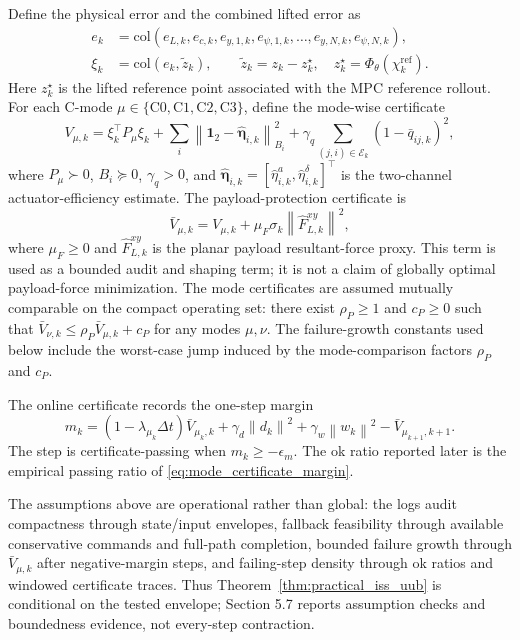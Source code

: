 \documentclass[twocolumn,3p,times,procedia]{elsarticle}
\newcommand{\norm}[1]{\left\lVert #1 \right\rVert}
\begin{document}
Define the physical error and the combined lifted error as
\begin{equation}
\begin{aligned}
e_k&=\mathrm{col}\left(e_{L,k},e_{c,k},e_{y,1,k},e_{\psi,1,k},\ldots,e_{y,N,k},e_{\psi,N,k}\right),\\
\xi_k&=\mathrm{col}\left(e_k,\tilde z_k\right),
\qquad
\tilde z_k=z_k-z_k^\star,\quad
z_k^\star=\Phi_\theta(\chi_k^{\mathrm{ref}}).
\end{aligned}
\label{eq:xi_def}
\end{equation}
Here $z_k^\star$ is the lifted reference point associated with the MPC reference rollout. For each C-mode $\mu\in\{\mathrm{C0},\mathrm{C1},\mathrm{C2},\mathrm{C3}\}$, define the mode-wise certificate
\begin{equation}
V_{\mu,k}=\xi_k^\top P_\mu\xi_k+
\sum_i\norm{\mathbf 1_2-\hat{\boldsymbol\eta}_{i,k}}_{B_i}^2+
\gamma_q\sum_{(j,i)\in\mathcal E_k}(1-\bar q_{ij,k})^2 ,
\label{eq:lyapunov}
\end{equation}
where $P_\mu\succ0$, $B_i\succeq0$, $\gamma_q>0$, and
$\hat{\boldsymbol\eta}_{i,k}=[\hat\eta^a_{i,k},\hat\eta^\delta_{i,k}]^\top$ is the two-channel actuator-efficiency estimate. The payload-protection certificate is
\begin{equation}
\bar V_{\mu,k}=V_{\mu,k}+\mu_F\sigma_k\norm{\hat F_{L,k}^{xy}}^2 ,
\label{eq:augmented_lyapunov}
\end{equation}
where $\mu_F\ge0$ and $\hat F_{L,k}^{xy}$ is the planar payload resultant-force proxy. This term is used as a bounded audit and shaping term; it is not a claim of globally optimal payload-force minimization. The mode certificates are assumed mutually comparable on the compact operating set: there exist $\rho_P\ge1$ and $c_P\ge0$ such that
$\bar V_{\nu,k}\le \rho_P\bar V_{\mu,k}+c_P$ for any modes $\mu,\nu$.
The failure-growth constants used below include the worst-case jump induced by the mode-comparison factors $\rho_P$ and $c_P$.

The online certificate records the one-step margin
\begin{equation}
m_k=(1-\lambda_{\mu_k}\Delta t)\bar V_{\mu_k,k}
+\gamma_d\norm{d_k}^2+\gamma_w\norm{w_k}^2
-\bar V_{\mu_{k+1},k+1}.
\label{eq:mode_certificate_margin}
\end{equation}
The step is certificate-passing when $m_k\ge-\epsilon_m$. The ok ratio reported later is the empirical passing ratio of \eqref{eq:mode_certificate_margin}.

The assumptions above are operational rather than global: the logs audit compactness through state/input envelopes, fallback feasibility through available conservative commands and full-path completion, bounded failure growth through $\bar V_{\mu,k}$ after negative-margin steps, and failing-step density through ok ratios and windowed certificate traces. Thus Theorem~\ref{thm:practical_iss_uub} is conditional on the tested envelope; Section 5.7 reports assumption checks and boundedness evidence, not every-step contraction.
\end{document}
